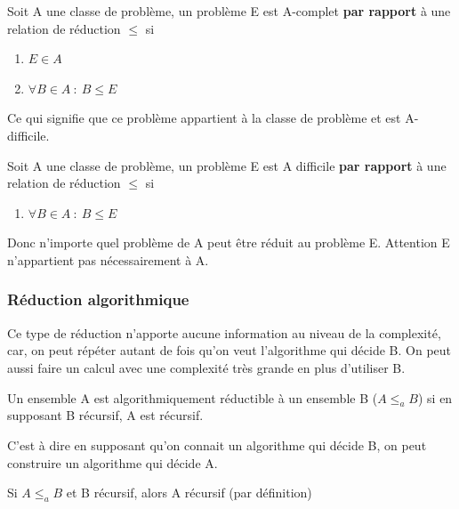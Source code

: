\begin{mydef}[A-complet]
	Soit A une classe de problème, un problème E est A-complet
	\textbf{par rapport} à une relation de réduction $\leq$ si 
	\begin{enumerate}
		\item $E \in A$
		\item $\forall B \in A \ : \ B \leq E$
	\end{enumerate}
\end{mydef}

\begin{myrem}
	Ce qui signifie que ce problème appartient à la classe de problème et 
	est A-difficile.	
\end{myrem}

\begin{mydef}[A-difficile]
	Soit A une classe de problème, un problème E est A difficile
	\textbf{par rapport} à une relation de réduction $\leq$ si 
	\begin{enumerate}
		\item $\forall B \in A \ : \ B \leq E$
	\end{enumerate}
\end{mydef}
	
\begin{myrem}
	Donc n'importe quel problème de A peut être réduit au problème E. 
	Attention E n'appartient pas nécessairement à A.
\end{myrem}


\subsubsection{Réduction algorithmique}
Ce type de réduction n'apporte aucune information au niveau de la complexité, car, on 
peut répéter autant de fois qu'on veut l'algorithme qui décide B. On peut aussi 
faire un calcul avec une complexité très grande en plus d'utiliser B.

\begin{mydef}
	Un ensemble A est algorithmiquement réductible à un ensemble B 
	($A\leq_a B$) si en supposant B récursif, A est récursif.
\end{mydef}

\begin{myrem}
	C'est à dire en supposant qu'on connait un algorithme qui décide B, on 
	peut construire un algorithme qui décide A.
\end{myrem}

\begin{myprop}
	Si $A \leq_a B$ et B récursif, alors A récursif (par définition)
\end{myprop}

